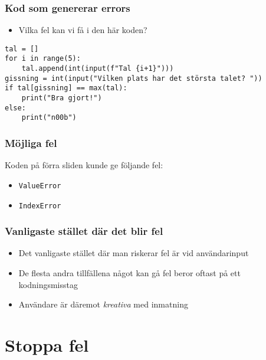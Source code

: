 \documentclass[aspectratio=169]{beamer}
\begin{document}
\begin{frame}[fragile]
	\frametitle{Kod som genererar errors}

	\begin{itemize}
		\item Vilka fel kan vi få i den här koden?
	\end{itemize}

	\begin{lstlisting}
tal = []
for i in range(5):
    tal.append(int(input(f"Tal {i+1}")))
gissning = int(input("Vilken plats har det största talet? "))
if tal[gissning] == max(tal):
    print("Bra gjort!")
else:
    print("n00b")
	\end{lstlisting}

\end{frame}

\begin{frame}
	\frametitle{Möjliga fel}
	
	Koden på förra sliden kunde ge följande fel:

	\begin{itemize}
		\item \texttt{ValueError}
		\item \texttt{IndexError}
	\end{itemize}

\end{frame}

\begin{frame}
	\frametitle{Vanligaste stället där det blir fel}

	\begin{itemize}
		\item Det vanligaste stället där man riskerar fel är vid användarinput
		\item De flesta andra tillfällena något kan gå fel beror oftast på ett kodningsmisstag
		\item Användare är däremot \textit{kreativa} med inmatning
	\end{itemize}

\end{frame}

\section{Stoppa fel}
\end{document}
